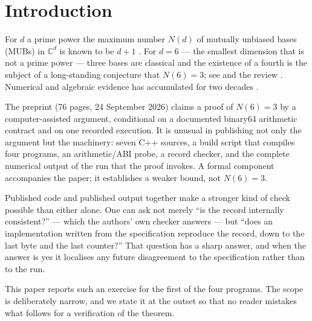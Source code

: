 \documentclass[11pt,a4paper]{article}
\begin{document}
\tableofcontents

\section{Introduction}

For $d$ a prime power the maximum number $N(d)$ of mutually unbiased bases (MUBs) in $\mathbb{C}^d$ is
known to be $d+1$ \citep{Ivanovic1981StateDetermination,WoottersFields1989,BandyopadhyayEtAl2002,
KlappeneckerRotteler2004}. For $d=6$ --- the smallest dimension that is not a prime power --- three
bases are classical and the existence of a fourth is the subject of a long-standing conjecture that
$N(6)=3$; see \citet{Zauner1999,Zauner2011} and the review \citep{McNultyWeigert2026Review}. Numerical
and algebraic evidence has accumulated for two decades
\citep{ButterleyHall2007Numerical,BrierleyWeigert2008,BrierleyWeigert2009,JamingEtAl2009,
JamingMatolcsiMora2010,BengtssonEtAl2007MUBHadamard,Grassl2004SICMUB6,
CardenesWuttigTindall2026Classification,MatolcsiEtAl2026}.

The preprint \citep{OpenAIMUB2026} (76 pages, 24 September 2026) claims a proof of $N(6)=3$ by a
computer-assisted argument, conditional on a documented binary64 arithmetic contract and on one
recorded execution. It is unusual in publishing not only the argument but the machinery: seven C++
sources, a build script that compiles four programs, an arithmetic/ABI probe, a record checker, and
the complete numerical output of the run that the proof invokes. A formal component accompanies the
paper; it establishes a weaker bound, not $N(6)=3$.

Published code and published output together make a stronger kind of check possible than either
alone. One can ask not merely ``is the record internally consistent?'' --- which the authors' own
checker answers --- but ``does an implementation written from the specification reproduce the record,
down to the last byte and the last counter?'' That question has a sharp answer, and when the answer is
yes it localises any future disagreement to the specification rather than to the run.

This paper reports such an exercise for the first of the four programs. The scope is deliberately
narrow, and we state it at the outset so that no reader mistakes what follows for a verification of
the theorem.
\end{document}
